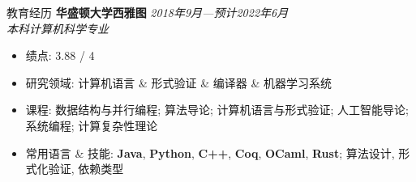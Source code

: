 \documentclass{resume}
\begin{document}
	\begin{rSection}{教育经历}
	{\bf 华盛顿大学西雅图} \hfill {\em 2018年9月---预计2022年6月} \\
	\textit{本科计算机科学专业}
	\vspace{-5pt}
        \begin{itemize}[leftmargin=*]
            \setlength{\itemsep}{1pt}
            \setlength{\parskip}{0pt}
			\setlength{\parsep}{0pt}
			\item 绩点: 3.88 / 4
            \item 研究领域: 计算机语言 \& 形式验证 \& 编译器 \& 机器学习系统
            \item 课程: 数据结构与并行编程; 算法导论; 计算机语言与形式验证; 人工智能导论; 系统编程; 计算复杂性理论
			\item 常用语言 \& 技能: \textbf{Java}, \textbf{Python}, \textbf{C++}, \textbf{Coq}, \textbf{OCaml}, \textbf{Rust}; 算法设计, 形式化验证, 依赖类型
		\end{itemize}
	\end{rSection}
	\vspace{-5pt}

\end{document}
